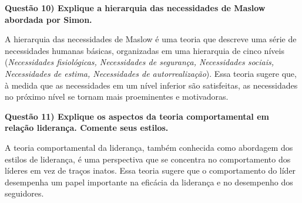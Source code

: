 \documentclass[11pt]{article}
\begin{document}
\noindent \textbf{Questão 10) Explique a hierarquia das necessidades de Maslow abordada por Simon.}\par
A hierarquia das necessidades de Maslow é uma teoria que descreve uma série de necessidades humanas básicas, organizadas em uma hierarquia de cinco níveis (\emph{Necessidades fisiológicas, Necessidades de segurança, Necessidades sociais, Necessidades de estima, Necessidades de autorrealização}). Essa teoria sugere que, à medida que as necessidades em um nível inferior são satisfeitas, as necessidades no próximo nível se tornam mais proeminentes e motivadoras.

\noindent \textbf{Questão 11) Explique os aspectos da teoria comportamental em relação liderança. Comente seus estilos.}\par
A teoria comportamental da liderança, também conhecida como abordagem dos estilos de liderança, é uma perspectiva que se concentra no comportamento dos líderes em vez de traços inatos. Essa teoria sugere que o comportamento do líder desempenha um papel importante na eficácia da liderança e no desempenho dos seguidores.
\end{document}
